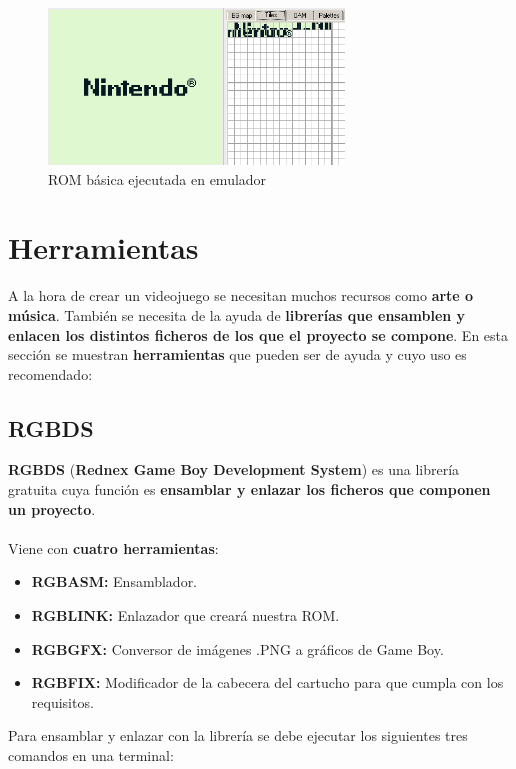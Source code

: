 \begin{figure}[h]
\centering
\includegraphics[width=0.7\textwidth]{include/images/VRAM/baseROM.png}
\caption{ROM básica ejecutada en emulador}
\label{figure:baseROM}
\end{figure}

\section{Herramientas}

A la hora de crear un videojuego se necesitan muchos recursos como \textbf{arte o música}. También se necesita de la ayuda de \textbf{librerías que ensamblen y enlacen los distintos ficheros de los que el proyecto se compone}. En esta sección se muestran \textbf{herramientas} que pueden ser de ayuda y cuyo uso es recomendado:

\subsection{RGBDS}

\textbf{RGBDS} (\textbf{Rednex Game Boy Development System}) es una librería gratuita cuya función es \textbf{ensamblar y enlazar los ficheros que componen un proyecto}.
\\ \\
Viene con \textbf{cuatro herramientas}:

\begin{itemize}
	\item \textbf{RGBASM:} Ensamblador.
	\item \textbf{RGBLINK:} Enlazador que creará nuestra ROM.
	\item \textbf{RGBGFX:} Conversor de imágenes .PNG a gráficos de Game Boy. 
	\item \textbf{RGBFIX:} Modificador de la cabecera del cartucho para que cumpla con los requisitos.
\end{itemize}

\clearpage

Para ensamblar y enlazar con la librería se debe ejecutar los siguientes tres comandos en una terminal:

